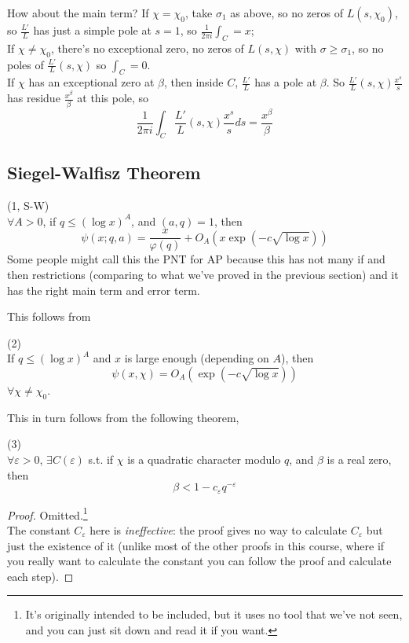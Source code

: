 \documentclass[a4paper]{article}
\begin{document}
How about the main term? If $\chi = \chi_0$, take $\sigma_1$ as above, so no zeros of $L(s,\chi_0)$, so $\frac{L'}{L}$ has just a simple pole at $s=1$, so $\frac{1}{2\pi i} \int_C = x$;\\
If $\chi \neq \chi_0$, there's no exceptional zero, no zeros of $L(s,\chi)$ with $\sigma \geq \sigma_1$, so no poles of $\frac{L'}{L}(s,\chi)$ so $\int_C = 0$.\\
If $\chi$ has an exceptional zero at $\beta$, then inside $C$, $\frac{L'}{L}$ has a pole at $\beta$. So $\frac{L'}{L}(s,\chi) \frac{x^s}{s}$ has residue $\frac{x^\beta}{\beta}$ at this pole, so 
\[
\frac{1}{2\pi i} \int_C \frac{L'}{L}(s,\chi) \frac{x^s}{s} ds = \frac{x^\beta}{\beta}
\]

\subsection{Siegel-Walfisz Theorem}

\begin{thm} (1, S-W)\\
$\forall A > 0$, if $q \leq (\log x)^A$, and $(a,q) = 1$, then
\[
\psi(x;q,a) = \frac{x}{\varphi(q)} + O_A(x \exp(-c\sqrt{\log x}))
\]
Some people might call this the PNT for AP because this has not many if and then restrictions (comparing to what we've proved in the previous section) and it has the right main term and error term.
\end{thm}
This follows from
\begin{thm} (2)\\
If $q \leq (\log x)^A$ and $x$ is large enough (depending on $A$), then 
\[
\psi(x,\chi) = O_A(\exp (-c\sqrt{\log x}))
\]
$\forall \chi \neq \chi_0$.
\end{thm}
This in turn follows from the following theorem,
\begin{thm} (3)\\
$\forall \varepsilon > 0$, $\exists C(\varepsilon)$ s.t. if $\chi$ is a quadratic character modulo $q$, and $\beta$ is a real zero, then 
\[
\beta < 1 - c_\varepsilon q^{-\varepsilon}
\]
\begin{proof}
Omitted.\footnote{It's originally intended to be included, but it uses no tool that we've not seen, and you can just sit down and read it if you want.}\\
The constant $C_\varepsilon$ here is \emph{ineffective}: the proof gives no way to calculate $C_\varepsilon$ but just the existence of it (unlike most of the other proofs in this course, where if you really want to calculate the constant you can follow the proof and calculate each step).
\end{proof}
\end{thm}
\end{document}
